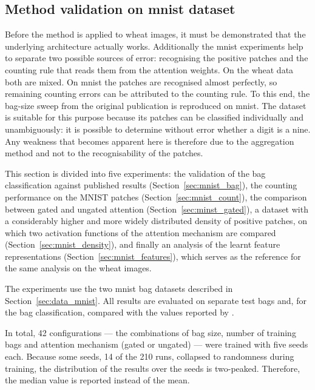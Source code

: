 \documentclass[12pt,parskip = half, DIV=classic,listof=totoc]{scrartcl}
\begin{document}
		\subsection{Method validation on \acs*{mnist} dataset}\label{sec:mnist_val}
			Before the method is applied to wheat images, it must be demonstrated that
			the underlying architecture actually works.  Additionally the \ac{mnist} experiments help to separate two possible sources of error: recognising the positive patches 
			and the counting rule that reads them from the attention weights. On the wheat data both are mixed. On \ac{mnist} the 
			patches are recognised almost perfectly, so remaining counting errors can be attributed to the counting rule. 
			To this end, the bag-size sweep from the original publication is reproduced on \ac{mnist}. The
			dataset is suitable for this purpose because its patches can be classified individually and unambiguously: it is possible to determine without error
			whether a digit is a nine. Any weakness that becomes apparent here is therefore due to the
			aggregation method and not to the recognisability of the patches.

			This section is divided into five experiments: the validation of the bag
			classification against published results (Section~\ref{sec:mnist_bag}), the
			counting performance on the MNIST patches
			(Section~\ref{sec:mnist_count}), the comparison between gated and ungated attention
			(Section~\ref{sec:minst_gated}), a dataset with a considerably higher and more widely
			distributed density of positive patches, on which two activation functions of the
			attention mechanism are compared (Section~\ref{sec:mnist_density}), and finally an
			analysis of the learnt feature representations (Section~\ref{sec:mnist_features}),
			which serves as the reference for the same analysis on the wheat images.
			
			The experiments use the two \ac{mnist} bag datasets described in
			Section~\ref{sec:data_mnist}. All results are evaluated on separate test bags and,
			for the bag classification, compared with the values reported by
			\textcite{ilseAttentionbasedDeepMultiple2018}.

			In total, 42 configurations — the combinations of bag size, number of training bags and attention mechanism (gated or ungated) — 
			were trained with five seeds each. Because some seeds, 14 of the 210 runs, collapsed to randomness during training, 
			the distribution of the results over the seeds is two-peaked. Therefore, the median value is reported instead of the mean. 
\end{document}
